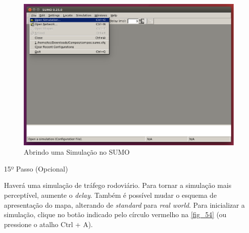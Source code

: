 \documentclass[
12pt,				%
openright,			%
oneside,			%
a4paper,			%
brazil,				%
]{abntex2}
\begin{document}
{\begin{anexosenv}
                \begin{figure} [H]
	                \centering
	                \includegraphics[scale=.33]{figuras/aneB/53SumoOpenSimulation}
	                \caption{\label{fig_53}Abrindo uma Simulação no SUMO}
                \end{figure}
                    

            	\begin{description}
	                \item[15º Passo (Opcional)]
	            \end{description}
	            \par Haverá uma simulação de tráfego rodoviário. Para tornar a simulação mais perceptível, aumente o \textit{delay}. Também é possível mudar o esquema de apresentação do mapa, alterando de \textit{standard} para \textit{real world}. Para inicializar a simulação, clique no botão indicado pelo círculo vermelho na \autoref{fig_54} (ou pressione o atalho Ctrl + A).
		            

\end{anexosenv}}
\end{document}

